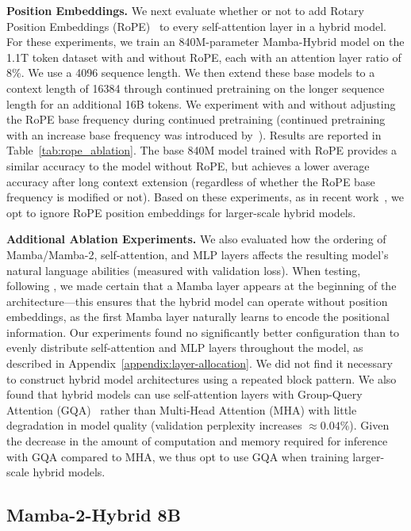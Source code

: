 \textbf{Position Embeddings.} We next evaluate whether or not to add Rotary Position Embeddings (RoPE)~\citep{su2024roformer} to every self-attention layer in a hybrid model. For these experiments, we train an 840M-parameter Mamba-Hybrid model on the 1.1T token dataset with and without RoPE, each with an attention layer ratio of 8\%. We use a 4096 sequence length. We then extend these base models to a context length of 16384 through continued pretraining on the longer sequence length for an additional 16B tokens. We experiment with and without adjusting the RoPE base frequency during continued pretraining (continued pretraining with an increase base frequency was introduced by~\citep{xiong2023effective}). Results are reported in Table~\ref{tab:rope_ablation}. The base 840M model trained with RoPE provides a similar accuracy to the model without RoPE, but achieves a lower average accuracy after long context extension (regardless of whether the RoPE base frequency is modified or not). Based on these experiments, as in recent work~\citep{lieber2024jamba}, we opt to ignore RoPE position embeddings for larger-scale hybrid models.

\textbf{Additional Ablation Experiments.} We also evaluated how the ordering of Mamba/Mamba-2, self-attention, and MLP layers affects the resulting model's natural language abilities (measured with validation loss). When testing, following \citep{park2024can}, we made certain that a Mamba layer appears at the beginning of the architecture---this ensures that the hybrid model can operate without position embeddings, as the first Mamba layer naturally learns to encode the positional information. Our experiments found no significantly better configuration than to evenly distribute self-attention and MLP layers throughout the model, as described in Appendix~\ref{appendix:layer-allocation}. We did not find it necessary to construct hybrid model architectures using a repeated block pattern. We also found that hybrid models can use self-attention layers with Group-Query Attention (GQA)~\citep{ainslie2023gqa} rather than Multi-Head Attention (MHA) with little degradation in model quality (validation perplexity increases $\approx 0.04\%$). Given the decrease in the amount of computation and memory required for inference with GQA compared to MHA, we thus opt to use GQA when training larger-scale hybrid models.

\subsection{Mamba-2-Hybrid 8B}

